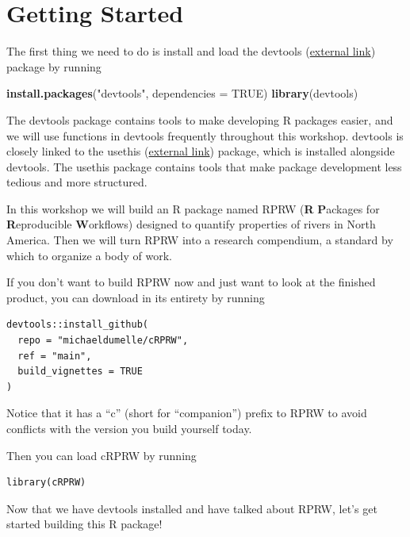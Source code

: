 \documentclass[
]{book}
\newenvironment{Shaded}{\begin{snugshade}}{\end{snugshade}}
\newcommand{\DataTypeTok}[1]{\textcolor[rgb]{0.13,0.29,0.53}{#1}}
\newcommand{\KeywordTok}[1]{\textcolor[rgb]{0.13,0.29,0.53}{\textbf{#1}}}
\newcommand{\NormalTok}[1]{#1}
\newcommand{\OtherTok}[1]{\textcolor[rgb]{0.56,0.35,0.01}{#1}}
\newcommand{\StringTok}[1]{\textcolor[rgb]{0.31,0.60,0.02}{#1}}
\begin{document}
\hypertarget{getting-started}{%
\section*{Getting Started}\label{getting-started}}

The first thing we need to do is install and load the devtools (\href{https://devtools.r-lib.org/}{external link}) package by running

\begin{Shaded}
\begin{Highlighting}[]
\KeywordTok{install.packages}\NormalTok{(}\StringTok{"devtools"}\NormalTok{, }\DataTypeTok{dependencies =} \OtherTok{TRUE}\NormalTok{)}
\KeywordTok{library}\NormalTok{(devtools)}
\end{Highlighting}
\end{Shaded}

The devtools package contains tools to make developing R packages easier, and we will use functions in devtools frequently throughout this workshop. devtools is closely linked to the usethis (\href{https://usethis.r-lib.org/}{external link}) package, which is installed alongside devtools. The usethis package contains tools that make package development less tedious and more structured.

In this workshop we will build an R package named RPRW (\textbf{R} \textbf{P}ackages for \textbf{R}eproducible \textbf{W}orkflows) designed to quantify properties of rivers in North America. Then we will turn RPRW into a research compendium, a standard by which to organize a body of work.

If you don't want to build RPRW now and just want to look at the finished product, you can download in its entirety by running

\begin{verbatim}
devtools::install_github(
  repo = "michaeldumelle/cRPRW",
  ref = "main",
  build_vignettes = TRUE
)
\end{verbatim}

Notice that it has a ``c'' (short for ``companion'') prefix to RPRW to avoid conflicts with the version you build yourself today.

Then you can load cRPRW by running

\begin{verbatim}
library(cRPRW)
\end{verbatim}

Now that we have devtools installed and have talked about RPRW, let's get started building this R package!
\end{document}
